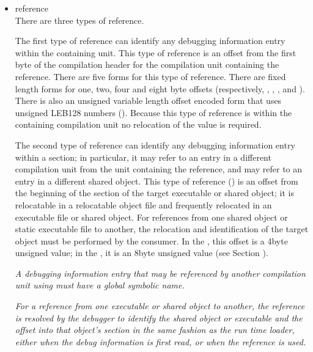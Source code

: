 \begin{itemize}
\item reference \\
There are three types of reference.

The 
first type of reference can identify any debugging
information entry within the containing unit. 
This type of
reference is an 
offset from the first byte of the compilation
header for the compilation unit containing the reference. There
are five forms for this type of reference. There are fixed
length forms for one, two, four and eight byte offsets
(respectively, , 
, 
,
and ). 
There is also an unsigned variable
length offset encoded form that uses unsigned LEB128 numbers
(). 
Because this type of reference is within
the containing compilation unit no relocation of the value
is required.

The second type of reference can identify any debugging
information entry within a 
\dotdebuginfo{} section; in particular,
it may refer to an entry in a different compilation unit
from the unit containing the reference, and may refer to an
entry in a different shared object.  This type of reference
() 
is an offset from the beginning of the
\dotdebuginfo{} 
section of the target executable or shared object;
it is relocatable in a relocatable object file and frequently
relocated in an executable file or shared object. For
references from one shared object or static executable file
to another, the relocation and identification of the target
object must be performed by the consumer. In the 
\thirtytwobitdwarfformat, this offset is a 4\dash byte unsigned value; 
in the \sixtyfourbitdwarfformat, it is an 8\dash byte
unsigned value 
(see Section ).

\textit{A debugging information entry that may be referenced by
another compilation unit using 
 must have a
global symbolic name.}

\textit{For a reference from one executable or shared object to
another, the reference is resolved by the debugger to identify
the shared object or executable and the offset into that
object\textquoteright s \dotdebuginfo{}
section in the same fashion as the run
time loader, either when the debug information is first read,
or when the reference is used.}


\end{itemize}
